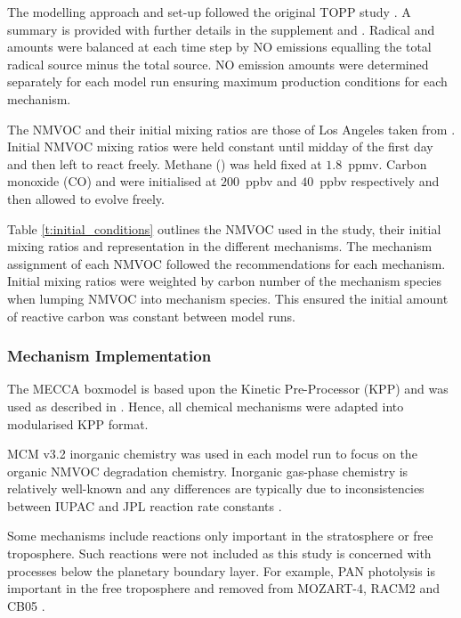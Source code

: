 The modelling approach and set-up followed the original TOPP study \citep{Butler:2011}.
A summary is provided with further details in the supplement and \citet{Butler:2011}. 
Radical and  amounts were balanced at each time step by NO emissions equalling the total radical source minus the total  source.
NO emission amounts were determined separately for each model run ensuring maximum  production conditions for each mechanism.

The NMVOC and their initial mixing ratios are those of Los Angeles taken from \citet{Baker:2008}. 
Initial NMVOC mixing ratios were held constant until midday of the first day and then left to react freely. 
Methane () was held fixed at \mbox{$1.8$ ppmv}. 
Carbon monoxide (CO) and  were initialised at \mbox{$200$ ppbv} and \mbox{$40$ ppbv} respectively and then allowed to evolve freely.

Table \ref{t:initial_conditions} outlines the NMVOC used in the study, their initial mixing ratios and representation in the different mechanisms.
The mechanism assignment of each NMVOC followed the recommendations for each mechanism.
Initial mixing ratios were weighted by carbon number of the mechanism species when lumping NMVOC into mechanism species. 
This ensured the initial amount of reactive carbon was constant between model runs.

\subsubsection{Mechanism Implementation} %

The MECCA boxmodel \citep{Sander:2005} is based upon the Kinetic Pre-Processor (KPP) \citep{Damian:2002} and was used as described in \citet{Butler:2011}. 
Hence, all chemical mechanisms were adapted into modularised KPP format.

MCM v3.2 inorganic chemistry was used in each model run to focus on the organic NMVOC degradation chemistry.
Inorganic gas-phase chemistry is relatively well-known and any differences are typically due to inconsistencies between IUPAC and JPL reaction rate constants \citep{Emmerson:2009}.

Some mechanisms include reactions only important in the stratosphere or free troposphere. 
Such reactions were not included as this study is concerned with processes below the planetary boundary layer. 
For example, PAN photolysis is important in the free troposphere and removed from MOZART-4, RACM2 and CB05 \citep{Harwood:2003}.  

